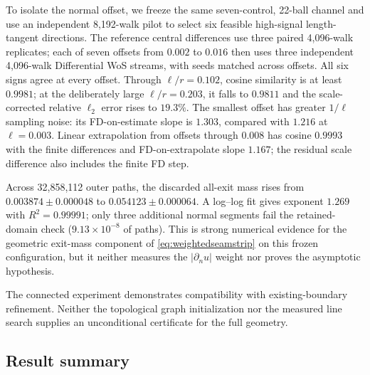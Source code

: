 To isolate the normal offset, we freeze the same seven-control, 22-ball channel
and use an independent 8,192-walk pilot to select six feasible high-signal
length-tangent directions.  The reference central differences use three paired
4,096-walk replicates; each of seven offsets from $0.002$ to $0.016$ then uses
three independent 4,096-walk Differential WoS streams, with seeds matched
across offsets.  All six signs agree at every offset.  Through
$\ell/r=0.102$, cosine similarity is at least $0.9981$; at the deliberately
large $\ell/r=0.203$, it falls to $0.9811$ and the scale-corrected relative
$\ell_2$ error rises to $19.3\%$.  The smallest offset has greater
$1/\ell$ sampling noise: its FD-on-estimate slope is $1.303$, compared with
$1.216$ at $\ell=0.003$.  Linear extrapolation from offsets through $0.008$
has cosine $0.9993$ with the finite differences and FD-on-extrapolate slope
$1.167$; the residual scale difference also includes the finite FD step.

Across 32,858,112 outer paths, the discarded all-exit mass rises from
$0.003874\pm0.000048$ to $0.054123\pm0.000064$.  A log--log fit gives exponent
$1.269$ with $R^2=0.99991$; only three additional normal segments fail the
retained-domain check ($9.13\times10^{-8}$ of paths).  This is strong numerical
evidence for the geometric exit-mass component of
\cref{eq:weightedseamstrip} on this frozen configuration, but it neither
measures the $|\partial_nu|$ weight nor proves the asymptotic hypothesis.

The connected experiment demonstrates compatibility with existing-boundary refinement. Neither the topological graph initialization nor the measured line search supplies an unconditional certificate for the full geometry.

\subsection{Result summary}

